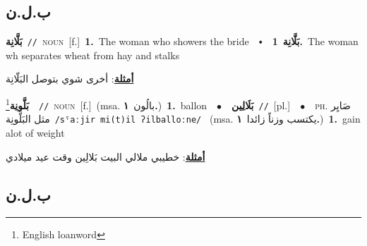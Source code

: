 \documentclass[10pt,a4paper,twoside]{article} %
\begin{document}
\begin{multicols}{2}
\vspace{-3mm}
\subsection*{\color{blue}\foreignlanguage{arabic}{ب.ل.ن}\color{blue}{}} 

{\setlength\topsep{0pt}\textbf{\foreignlanguage{arabic}{بَلَّانِة}}\ {\color{gray}\texttt{//}\color{black}}\ \textsc{noun}\ [f.]\ \textbf{1.}~The woman who showers the bride\ \ $\smblkdiamond$\ \ \setlength\topsep{0pt}\textbf{\foreignlanguage{arabic}{بَلَّانِة}}\ \textbf{1.}~The woman wh separates wheat from hay and stalks\  \begin{flushright}\color{gray}\foreignlanguage{arabic}{\textbf{\underline{\foreignlanguage{arabic}{أمثلة}}}: أخرى شوي بتوصل البَلّانِة}\end{flushright}\color{black}} \vspace{2mm}

{\setlength\topsep{0pt}\textbf{\foreignlanguage{arabic}{بَلَّونِة}}\footnote{English loanword}\ \ {\color{gray}\texttt{//}\color{black}}\ \textsc{noun}\ [f.]\ \color{gray}(msa. \foreignlanguage{arabic}{بالُون}~\foreignlanguage{arabic}{\textbf{١.}})\color{black}\ \textbf{1.}~ballon\ \ $\bullet$\ \ \setlength\topsep{0pt}\textbf{\foreignlanguage{arabic}{بَلَالِين}}\ {\color{gray}\texttt{//}\color{black}}\ [pl.]\ \ $\bullet$\ \ \textsc{ph.} \color{gray} \foreignlanguage{arabic}{صَايِر مثل البَلَّونِة}\color{black}\ {\color{gray}\texttt{/{\sffamily sˤaːjir mi(t)il ʔilballoːne}/}\color{black}}\ \color{gray} (msa. \foreignlanguage{arabic}{يكتسب وزناً زائدا}~\foreignlanguage{arabic}{\textbf{١.}})\color{black}\ \textbf{1.}~gain alot of weight\  \begin{flushright}\color{gray}\foreignlanguage{arabic}{\textbf{\underline{\foreignlanguage{arabic}{أمثلة}}}: خطيبي ملالي البيت بَلالِين وقت عيد ميلادي}\end{flushright}\color{black}} \vspace{2mm}

\vspace{-3mm}
\subsection*{\color{blue}\foreignlanguage{arabic}{ب.ل.ن}\color{blue}{ (ntws)}} 


\end{multicols}
\end{document}
